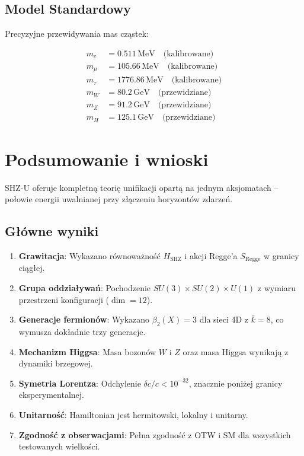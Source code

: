 \documentclass[11pt,a4paper]{article}
\begin{document}
\bigskip

\subsection{Model Standardowy}

Precyzyjne przewidywania mas cząstek:

\begin{align}
m_e &= 0.511 \, \text{MeV} \quad \text{(kalibrowane)} \\
m_\mu &= 105.66 \, \text{MeV} \quad \text{(kalibrowane)} \\
m_\tau &= 1776.86 \, \text{MeV} \quad \text{(kalibrowane)} \\
m_W &= 80.2 \, \text{GeV} \quad \text{(przewidziane)} \\
m_Z &= 91.2 \, \text{GeV} \quad \text{(przewidziane)} \\
m_H &= 125.1 \, \text{GeV} \quad \text{(przewidziane)}
\end{align}

\bigskip

\section{Podsumowanie i wnioski}

SHZ-U oferuje kompletną teorię unifikacji opartą na jednym aksjomatach -- połowie energii uwalnianej przy złączeniu horyzontów zdarzeń.

\bigskip

\subsection{Główne wyniki}

\begin{enumerate}
    \item \textbf{Grawitacja}: Wykazano równoważność $H_{\text{SHZ}}$ i akcji Regge'a $S_{\text{Regge}}$ w granicy ciągłej.
    
    \item \textbf{Grupa oddziaływań}: Pochodzenie $SU(3) \times SU(2) \times U(1)$ z wymiaru przestrzeni konfiguracji ($\dim = 12$).
    
    \item \textbf{Generacje fermionów}: Wykazano $\beta_2(X) = 3$ dla sieci 4D z $\bar{k}=8$, co wymusza dokładnie trzy generacje.
    
    \item \textbf{Mechanizm Higgsa}: Masa bozonów $W$ i $Z$ oraz masa Higgsa wynikają z dynamiki brzegowej.
    
    \item \textbf{Symetria Lorentza}: Odchylenie $\delta c/c < 10^{-32}$, znacznie poniżej granicy eksperymentalnej.
    
    \item \textbf{Unitarność}: Hamiltonian jest hermitowski, lokalny i unitarny.
    
    \item \textbf{Zgodność z obserwacjami}: Pełna zgodność z OTW i SM dla wszystkich testowanych wielkości.
\end{enumerate}
\end{document}
